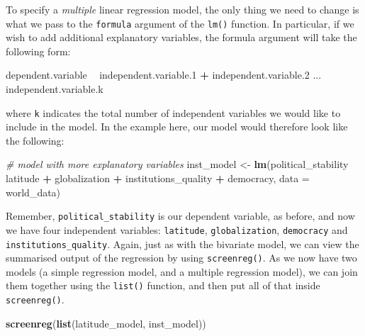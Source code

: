 \documentclass[]{article}
\newenvironment{Shaded}{\begin{snugshade}}{\end{snugshade}}
\newcommand{\KeywordTok}[1]{\textcolor[rgb]{0.13,0.29,0.53}{\textbf{#1}}}
\newcommand{\DataTypeTok}[1]{\textcolor[rgb]{0.13,0.29,0.53}{#1}}
\newcommand{\DecValTok}[1]{\textcolor[rgb]{0.00,0.00,0.81}{#1}}
\newcommand{\StringTok}[1]{\textcolor[rgb]{0.31,0.60,0.02}{#1}}
\newcommand{\CommentTok}[1]{\textcolor[rgb]{0.56,0.35,0.01}{\textit{#1}}}
\newcommand{\OperatorTok}[1]{\textcolor[rgb]{0.81,0.36,0.00}{\textbf{#1}}}
\newcommand{\NormalTok}[1]{#1}
\theoremstyle{definition}
\theoremstyle{definition}
\theoremstyle{definition}
\theoremstyle{remark}
\begin{document}
To specify a \emph{multiple} linear regression model, the only thing we
need to change is what we pass to the \texttt{formula} argument of the
\texttt{lm()} function. In particular, if we wish to add additional
explanatory variables, the formula argument will take the following
form:

\begin{Shaded}
\begin{Highlighting}[]
\NormalTok{dependent.variable }\OperatorTok{~}\StringTok{ }\NormalTok{independent.variable.}\DecValTok{1} \OperatorTok{+}\StringTok{ }\NormalTok{independent.variable.}\DecValTok{2}\NormalTok{ ... independent.variable.k}
\end{Highlighting}
\end{Shaded}

where \texttt{k} indicates the total number of independent variables we
would like to include in the model. In the example here, our model would
therefore look like the following:

\begin{Shaded}
\begin{Highlighting}[]
\CommentTok{# model with more explanatory variables}
\NormalTok{inst_model <-}\StringTok{ }\KeywordTok{lm}\NormalTok{(political_stability }\OperatorTok{~}\StringTok{ }\NormalTok{latitude }\OperatorTok{+}\StringTok{ }\NormalTok{globalization }\OperatorTok{+}\StringTok{ }\NormalTok{institutions_quality }\OperatorTok{+}\StringTok{ }\NormalTok{democracy, }
                 \DataTypeTok{data =}\NormalTok{ world_data)}
\end{Highlighting}
\end{Shaded}

Remember, \texttt{political\_stability} is our dependent variable, as
before, and now we have four independent variables: \texttt{latitude},
\texttt{globalization}, \texttt{democracy} and
\texttt{institutions\_quality}. Again, just as with the bivariate model,
we can view the summarised output of the regression by using
\texttt{screenreg()}. As we now have two models (a simple regression
model, and a multiple regression model), we can join them together using
the \texttt{list()} function, and then put all of that inside
\texttt{screenreg()}.

\begin{Shaded}
\begin{Highlighting}[]
\KeywordTok{screenreg}\NormalTok{(}\KeywordTok{list}\NormalTok{(latitude_model, inst_model))}
\end{Highlighting}
\end{Shaded}
\end{document}
